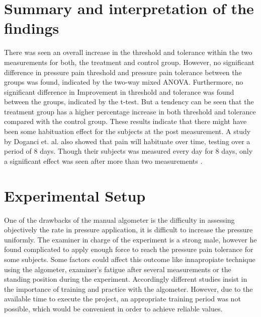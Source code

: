\section{Summary and interpretation of the findings}
There was seen an overall increase in the threshold and tolerance within the two measurements for both, the treatment and control group. However, no significant difference in pressure pain threshold and pressure pain tolerance between the groups was found, indicated by the two-way mixed ANOVA. Furthermore, no significant difference in Improvement in threshold and tolerance was found between the groups, indicated by the t-test. But a tendency can be seen that the treatment group has a higher percentage increase in both threshold and tolerance compared with the control group. These results indicate that there might have been some habituation effect for the subjects at the post measurement. A study by Doganci et. al. also showed that pain will habituate over time, testing over a period of 8 days. Though their subjects was measured every day for 8 days, only a significant effect was seen after more than two measurements \cite{Doganci2011}. 

\section{Experimental Setup}
One of the drawbacks of the manual algometer is the difficulty in assessing objectively the rate in pressure application, it is difficult to increase the pressure uniformly. The examiner in charge of the experiment is a strong male, however he found complicated to apply enough force to reach the pressure pain tolerance for some subjects. Some factors could affect this outcome like innapropiate technique using the algometer, examiner's fatigue after several measurements or the standing position during the experiment. Accordingly different studies insist in the importance of training and practice with the algometer. However, due to the available time to execute the project, an appropriate training period was not possible, which would be convenient in order to achieve reliable values.

